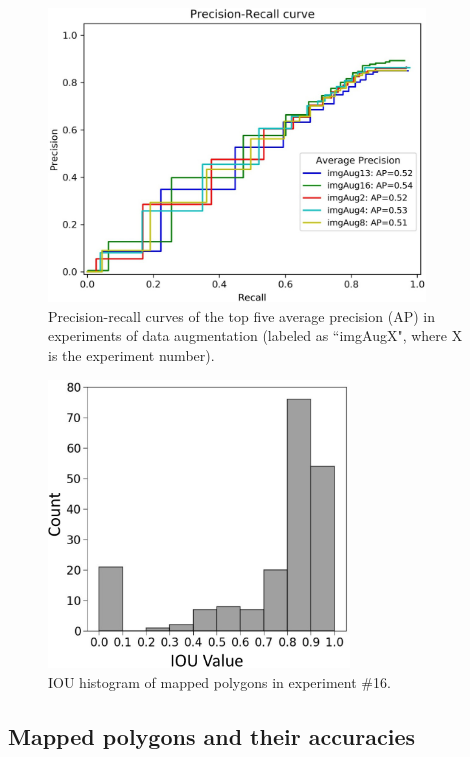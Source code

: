\documentclass[preprint,12pt,authoryear]{elsarticle}
\begin{document}
\begin{figure}
	\centering
	\includegraphics[width=10cm]{figures/top5_curves_trim.jpg}
	\caption{Precision-recall curves of the top five average precision (AP) in experiments of data augmentation (labeled as ``imgAugX", where X is the experiment number).}
	\label{fig_ap_top5}
\end{figure}

\begin{figure}
	\centering
	\includegraphics[width=8cm]{figures/IoU_imgAug16_label_trim.jpg}
	\caption{IOU histogram of mapped polygons in experiment \#16.}
	\label{fig_iou_hist_exp16}
\end{figure}

\subsection{Mapped polygons and their accuracies}
\label{subsec_mapped_accuracies}
\end{document}
